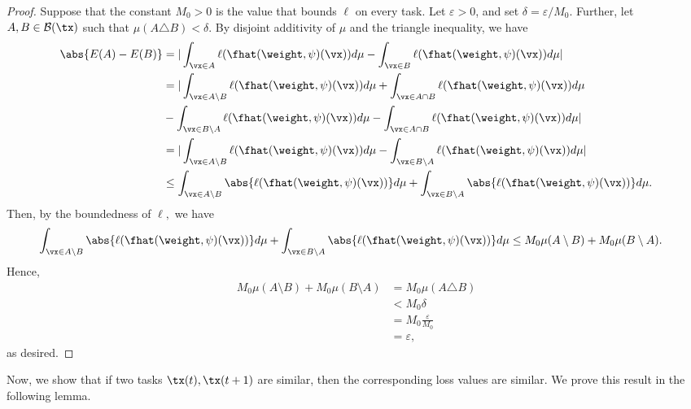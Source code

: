 \begin{proof}
    Suppose that the constant $M_0>0$ is the value that bounds $\ell$ on every task. Let $\varepsilon>0$, and set $\delta = \varepsilon/M_0.$ Further, let $A,B\in \mathcal{B}(\tx)$ such that $\mu(A\triangle B)<\delta.$ By disjoint additivity of $\mu$ and the triangle inequality, we have
    \begin{align*}
        \abs{E(A)-E(B)} & = \vert \int_{\vx\in A}
       \ell(\fhat(\weight,\psi
       )( \vx ) )d\mu - \int_{\vx\in B}
       \ell(\fhat(\weight,\psi
       )( \vx ) )d\mu\vert\\
       & = \vert \int_{\vx\in A\setminus B}
       \ell(\fhat(\weight,\psi
       )( \vx ) )d\mu + \int_{\vx\in A\cap B}
       \ell(\fhat(\weight,\psi
       )( \vx ) )d\mu\\
       & - \int_{\vx\in B\setminus A}
       \ell(\fhat(\weight,\psi
       )( \vx ) )d\mu - \int_{\vx\in A\cap B}
       \ell(\fhat(\weight,\psi
       )( \vx ) )d\mu\vert\\
       & = \vert \int_{\vx\in A\setminus B}
       \ell(\fhat(\weight,\psi
       )( \vx ) )d\mu - \int_{\vx\in B\setminus A}
       \ell(\fhat(\weight,\psi
       )( \vx ) )d\mu\vert\\
       & \leq \int_{\vx\in A\setminus B}
       \abs{\ell(\fhat(\weight,\psi
       )( \vx ) )}d\mu + \int_{\vx \in B\setminus A}
       \abs{\ell(\fhat(\weight,\psi
       )( \vx ) )}d\mu.
    \end{align*}
    Then, by the boundedness of $\ell,$ we have
    \begin{align*}
        \int_{\vx\in A\setminus B}
       \abs{\ell(\fhat(\weight,\psi
       )( \vx ) )}d\mu + \int_{\vx\in B\setminus A}
       \abs{\ell(\fhat(\weight,\psi
       )( \vx ) )}d\mu & \leq M_0\mu(A\setminus B)+M_0\mu(B\setminus A).
    \end{align*}
    Hence,
    \begin{align*}
        M_0\mu(A\setminus B)+M_0\mu(B\setminus A) & = M_0 \mu(A\triangle B)\\
        & <M_0\delta\\
        & = M_0\frac{\varepsilon}{M_0}\\
        & = \varepsilon,
    \end{align*}
    as desired.
\end{proof}
Now, we show that if two tasks $\tx(t), \tx(t+1)$  are similar, then the corresponding loss values are similar. We prove this result in the following lemma. 
